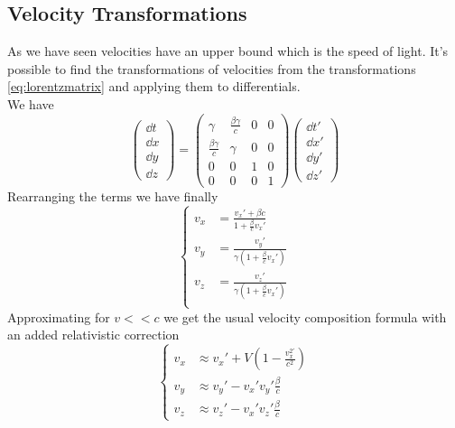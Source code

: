 \documentclass[../electromagnetism.tex]{subfiles}
\begin{document}
\subsection{Velocity Transformations}
As we have seen velocities have an upper bound which is the speed of light. It's possible to find the transformations of velocities from the transformations \eqref{eq:lorentzmatrix} and applying them to differentials.\\
We have
\begin{equation}
	\begin{pmatrix}\dd t\\\dd x\\ \dd y\\ \dd z\end{pmatrix}=\begin{pmatrix}\gamma&\frac{\beta\gamma}{c}&0&0\\\frac{\beta\gamma}{c}&\gamma&0&0\\0&0&1&0\\0&0&0&1\end{pmatrix}\begin{pmatrix}\dd t'\\\dd x'\\\dd y'\\\dd z'\end{pmatrix}
	\label{eq:difftranslor}
\end{equation}
Rearranging the terms we have finally
\begin{equation}
	\left\{\begin{aligned}
		v_x&=\frac{v_x'+\beta c}{1+\frac{\beta}{c}v_x'}\\
		v_y&=\frac{v_y'}{\gamma\left( 1+\frac{\beta}{c}v_x' \right)}\\
		v_z&=\frac{v_z'}{\gamma\left( 1+\frac{\beta}{c}v_x' \right)}\\
	\end{aligned}\right.
	\label{eq:veltrans}
\end{equation}
Approximating for $v<<c$ we get the usual velocity composition formula with an added relativistic correction
\begin{equation}
	\left\{\begin{aligned}
			v_x&\approx v_x'+V\left( 1-\frac{v^{2'}_x}{c^2} \right)\\
			v_y&\approx v_y'-v_x'v_y'\frac{\beta}{c}\\
			v_z&\approx v_z'-v_x'v_z'\frac{\beta}{c}
	\end{aligned}\right.
	\label{eq:velapprox}
\end{equation}
\end{document}
